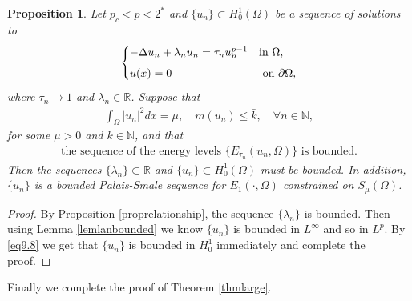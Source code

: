 \documentclass[10pt,a4paper]{article}
\newtheorem{proposition}[theorem]{Proposition}
\theoremstyle{definition} \theoremstyle{remark}
\numberwithin{equation}{section}
\newcommand{\R}{\mathbb{R}}
\newcommand{\N}{\mathbb{N}}
\newcommand{\la}{\lambda}
\begin{document}
\begin{proposition} \label{proplabounded}
	Let $p_c < p < 2^*$ and $\{u_n\} \subset H_0^1(\Omega)$ be a sequence of solutions to
	\begin{align} \label{eq9.8}
		\begin{cases}
			-\Delta u_n + \la_n u_n = \tau_n u_n^{p-1} & \text{in } \Omega, \\[1.5\jot]
			u(x) = 0 & \text{ on } \partial \Omega,
		\end{cases}
	\end{align}
	where $\tau_n \to 1$ and $\la_n \in \R$. Suppose that
	\begin{align*}
		\int_\Omega|u_n|^2dx = \mu, \quad m(u_n) \leq \bar{k}, \quad \forall n \in \N,
	\end{align*}
	for some $\mu > 0$ and $\bar{k} \in \N$, and that
	\begin{align}
		\text{the sequence of the energy levels } \{E_{\tau_n}(u_n,\Omega)\} \text{ is bounded}.
	\end{align}
	Then the sequences $\{\la_n\} \subset \R$ and $\{u_n\} \subset H_0^1(\Omega)$ must be bounded. In addition, $\{u_n\}$ is a bounded Palais-Smale sequence for $E_1(\cdot,\Omega)$ constrained on $S_\mu(\Omega)$.
\end{proposition}

\begin{proof}
	By Proposition \ref{proprelationship}, the sequence  $\{\la_n\}$ is bounded. Then using Lemma \ref{lemlanbounded} we know $\{u_n\}$ is bounded in $L^\infty$ and so in $L^p$. By \eqref{eq9.8} we get that $\{u_n\}$ is bounded in $H_0^1$ immediately and complete the proof.
\end{proof}

Finally we complete the proof of Theorem \ref{thmlarge}.
\end{document}
